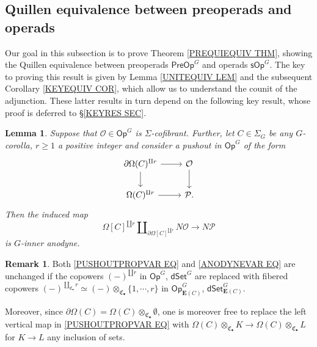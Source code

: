 \documentclass[a4paper,10pt
,draft
]{article}%
\numberwithin{equation}{section}
\numberwithin{figure}{section}
\newtheorem{lemma}[equation]{Lemma}%
\theoremstyle{definition} %
\newtheorem{remark}[equation]{Remark}%
\newcommand{\1}{\ensuremath{\mathbbm 1}}%
\begin{document}
\subsection{Quillen equivalence between preoperads and operads}
\label{PREOPOPEQUIV SEC}

Our goal in this subsection is to prove
Theorem \ref{PREQUIEQUIV THM},
showing the Quillen equivalence between
preoperads $\mathsf{PreOp}^G$
and operads $\mathsf{sOp}^G$.
The key to proving this result is given by 
Lemma \ref{UNITEQUIV LEM}
and the subsequent
Corollary \ref{KEYEQUIV COR},
which allow us to understand the counit of the adjunction.
These latter results in turn depend on the following key 
result, whose proof is deferred to \S \ref{KEYRES SEC}.


\begin{lemma}\label{KEYPRVAR LEM}
	Suppose that $\mathcal{O} \in \mathsf{Op}^{G}$
	is $\Sigma$-cofibrant.
	Further, let $C \in \Sigma_G$ be any $G$-corolla,
	$r \geq 1$ a positive integer and consider 
	a pushout in $\mathsf{Op}^{G}$ of the form
\begin{equation}\label{PUSHOUTPROPVAR EQ}
	\begin{tikzcd}
	\partial \Omega(C)^{\amalg r} \ar{r} \ar{d} 
	& \mathcal{O} \ar{d}
\\
	\Omega(C)^{\amalg r} \ar{r} & \mathcal{P}.
	\end{tikzcd}
\end{equation}
	Then the induced map
\begin{equation}\label{ANODYNEVAR EQ}
	\Omega[C]^{\amalg r} 
	\amalg_{\partial \Omega[C]^{\amalg r}} N\mathcal{O} \to N\mathcal{P}
\end{equation}
	is $G$-inner anodyne.
\end{lemma}

\begin{remark}\label{KEYPRVAR REM}
	Both \eqref{PUSHOUTPROPVAR EQ} and \eqref{ANODYNEVAR EQ}
	are unchanged if the copowers $(-)^{\amalg r}$ in 
	$\mathsf{Op}^G$, $\mathsf{dSet}^G$
	are replaced with fibered copowers 
	$(-)^{\amalg_{\mathfrak{C}_{\bullet}} r} \simeq 
	(-) \otimes_{\mathfrak{C}_{\bullet}} \{1,\cdots,r\}$
	in 
	$\mathsf{Op}^G_{\boldsymbol{E}(C)}$,
	$\mathsf{dSet}^G_{\boldsymbol{E}(C)}$.
	
	Moreover, since 
	$\partial \Omega(C) = \Omega(C) \otimes_{\mathfrak{C}_{\bullet}} \emptyset$,
	one is moreover free to replace
	the left vertical map in \eqref{PUSHOUTPROPVAR EQ}
	with 
	$\Omega(C) \otimes_{\mathfrak{C}_{\bullet}} K
	\to
	\Omega(C) \otimes_{\mathfrak{C}_{\bullet}} L$
	for $K\to L$ any inclusion of sets.
\end{remark}
\end{document}
